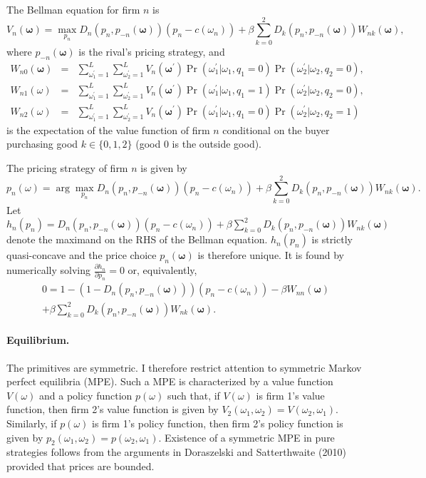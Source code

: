 \documentclass[11pt]{article}
\begin{document}
The Bellman equation for firm $n$ is
\begin{equation*}
V_n(\mathbf{\omega})=\max_{p_n }
D_n(p_n,p_{-n}(\mathbf{\omega}))(p_n-c(\omega_n))+\beta\sum_{k=0}^2D_k(p_n,p_{-n}(\mathbf{\omega}))W_{nk}(\mathbf{\omega}),
\end{equation*}%
where $p_{-n}(\mathbf{\omega})$ is the
rival's pricing strategy, and
\begin{eqnarray*}
W_{n0}(\mathbf{\omega}) & = & \sum_{\omega_1^\prime=1}^L\sum_{\omega_2^\prime=1}^LV_n(\mathbf{\omega}^\prime)\Pr(\omega_1^\prime|\omega_1,q_1=0)\Pr(\omega_2^\prime|\omega_2,q_2=0), \\
W_{n1}(\omega) & = & \sum_{\omega_1^\prime=1}^L\sum_{\omega_2^\prime=1}^LV_n(\mathbf{\omega}^\prime)\Pr(\omega_1^\prime|\omega_1,q_1=1)\Pr(\omega_2^\prime|\omega_2,q_2=0), \\
W_{n2}(\omega) & = & \sum_{\omega_1^\prime=1}^L\sum_{\omega_2^\prime=1}^LV_n(\mathbf{\omega}^\prime)\Pr(\omega_1^\prime|\omega_1,q_1=0)\Pr(\omega_2^\prime|\omega_2,q_2=1)
\end{eqnarray*}
is the expectation of the value function of firm $n$ conditional on the buyer purchasing good $k\in\{0,1,2\}$ (good $0$ is the outside good).

The pricing strategy of firm $n$ is given by
\begin{equation*}
p_n\left( \omega \right)
=\arg\max_{p_n}D_n(p_n,p_{-n}(\mathbf{\omega}))(p_n-c(\omega_n))+\beta\sum_{k=0}^2D_k(p_n,p_{-n}(\mathbf{\omega}))
W_{nk}(\mathbf{\omega}).
\end{equation*}%
Let
$h_n(p_n)=D_n(p_n,p_{-n}(\mathbf{\omega}))(p_n-c(\omega_n))+\beta\sum_{k=0}^2D_k(p_n,p_{-n}(\mathbf{\omega}))W_{nk}(\mathbf{\omega})$
denote the maximand on the RHS of the Bellman equation.
$h_n(p_n)$ is strictly quasi-concave and the price choice $p_n(%
\mathbf{\omega})$ is therefore unique. It is found by numerically solving $\frac{\partial h_n}{\partial p_n}=0$ or, equivalently,
\begin{gather*}
0=1-(1-D_n(p_n,p_{-n}(\mathbf{\omega})))\left(p_n-c(\omega_n)\right)-\beta W_{nn}(\mathbf{\omega})\\
+ \beta\sum_{k=0}^2D_k(p_n,p_{-n}(\mathbf{\omega}))W_{nk}(\mathbf{\omega}).
\end{gather*}

\paragraph{Equilibrium.}

The primitives are symmetric. I therefore restrict attention to
symmetric Markov perfect equilibria (MPE). Such a MPE is
characterized by a value function $V(\omega)$ and a policy function
$p(\omega)$ such that, if $V(\omega)$ is firm 1's value function,
then firm 2's value function is given by
$V_{2}(\omega_1,\omega_2)=V(\omega_2,\omega_1)$. Similarly, if
$p(\omega)$ is firm 1's policy function, then firm 2's policy
function is given by
$p_{2}(\omega_1,\omega_2)=p(\omega_2,\omega_1)$. Existence of a
symmetric MPE in pure strategies follows from the arguments in
Doraszelski and Satterthwaite (2010) provided that prices are bounded.
\end{document}
